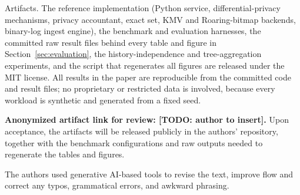 \documentclass[sigconf,anonymous,review]{acmart}
\begin{document}
\begin{openscience}
Artifacts. The reference implementation (Python service, differential-privacy mechanisms, privacy accountant, exact set, KMV and Roaring-bitmap backends, binary-log ingest engine), the benchmark and evaluation harnesses, the committed raw result files behind every table and figure in Section~\ref{sec:evaluation}, the history-independence and tree-aggregation experiments, and the script that regenerates all figures are released under the MIT license. All results in the paper are reproducible from the committed code and result files; no proprietary or restricted data is involved, because every workload is synthetic and generated from a fixed seed.

\textbf{Anonymized artifact link for review: [TODO: author to insert].}
Upon acceptance, the artifacts will be released publicly in the authors' repository, together with the benchmark configurations and raw outputs needed to regenerate the tables and figures.
\end{openscience}

\begin{ai}
The authors used generative AI-based tools to revise the text, improve flow and correct any typos, grammatical errors, and awkward phrasing.

\end{ai}
\end{document}

